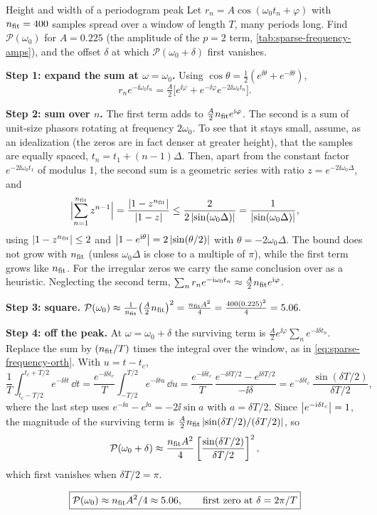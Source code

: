 \begin{sample}{Height and width of a periodogram peak}
Let $r_n=A\cos(\omega_0t_n+\varphi)$ with $n_{\rm fit}=400$ samples spread over a window of length $T$, many periods long. Find $\mathcal P(\omega_0)$ for $A=0.225$ (the amplitude of the $p=2$ term, \cref{tab:sparse-frequency-amps}), and the offset $\delta$ at which $\mathcal P(\omega_0+\delta)$ first vanishes.

\textbf{Step 1: expand the sum at $\omega=\omega_0$.} Using $\cos\theta=\tfrac12(e^{\ii\theta}+e^{-\ii\theta})$,
$$r_ne^{-\ii\omega_0t_n}=\tfrac A2\bigl[e^{\ii\varphi}+e^{-\ii\varphi}e^{-2\ii\omega_0t_n}\bigr].$$

\textbf{Step 2: sum over $n$.} The first term adds to $\tfrac A2n_{\rm fit}e^{\mathrm{i}\varphi}$. The second is a sum of unit-size phasors rotating at frequency $2\omega_0$. To see that it stays small, assume, as an idealization (the zeros are in fact denser at greater height), that the samples are equally spaced, $t_n=t_1+(n-1)\Delta$. Then, apart from the constant factor $e^{-2\ii\omega_0t_1}$ of modulus 1, the second sum is a geometric series with ratio $z=e^{-2\ii\omega_0\Delta}$, and
$$\Bigl|\sum_{n=1}^{n_{\rm fit}}z^{n-1}\Bigr|=\frac{\left\lvert 1-z^{n_{\rm fit}}\right\rvert}{\left\lvert 1-z\right\rvert}\le\frac{2}{2\left\lvert \sin(\omega_0\Delta)\right\rvert}=\frac{1}{\left\lvert \sin(\omega_0\Delta)\right\rvert},$$
using $\left\lvert 1-z^{n_{\rm fit}}\right\rvert\le2$ and $\left\lvert 1-e^{\mathrm{i}\theta}\right\rvert=2\left\lvert \sin(\theta/2)\right\rvert$ with $\theta=-2\omega_0\Delta$. The bound does not grow with $n_{\rm fit}$ (unless $\omega_0\Delta$ is close to a multiple of $\pi$), while the first term grows like $n_{\rm fit}$. For the irregular zeros we carry the same conclusion over as a heuristic. Neglecting the second term,
$\sum_nr_ne^{-\mathrm{i}\omega_0t_n}\approx\tfrac A2n_{\rm fit}e^{\mathrm{i}\varphi}$.

\textbf{Step 3: square.} $\mathcal P(\omega_0)\approx\frac{1}{n_{\rm fit}}\bigl(\tfrac A2n_{\rm fit}\bigr)^2=\frac{n_{\rm fit}A^2}{4}=\frac{400(0.225)^2}{4}=5.06.$

\textbf{Step 4: off the peak.} At $\omega=\omega_0+\delta$ the surviving term is $\tfrac A2e^{\ii\varphi}\sum_ne^{-\ii\delta t_n}$. Replace the sum by $(n_{\rm fit}/T)$ times the integral over the window, as in \eqref{eq:sparse-frequency-orth}. With $u=t-t_c$,
$$\frac1T\int_{t_c-T/2}^{t_c+T/2}e^{-\ii\delta t}\,\dd t=\frac{e^{-\ii\delta t_c}}{T}\int_{-T/2}^{T/2}e^{-\ii\delta u}\,\dd u=\frac{e^{-\ii\delta t_c}}{T}\,\frac{e^{-\ii\delta T/2}-e^{\ii\delta T/2}}{-\ii\delta}=e^{-\ii\delta t_c}\,\frac{\sin(\delta T/2)}{\delta T/2},$$
where the last step uses $e^{-\ii a}-e^{\ii a}=-2\ii\sin a$ with $a=\delta T/2$. Since $\left\lvert e^{-\mathrm{i}\delta t_c}\right\rvert=1$, the magnitude of the surviving term is $\tfrac A2n_{\rm fit}\left\lvert \sin(\delta T/2)/(\delta T/2)\right\rvert$, so
\begin{equation}
\mathcal P(\omega_0+\delta)\approx\frac{n_{\rm fit}A^2}{4}\left[\frac{\sin(\delta T/2)}{\delta T/2}\right]^2 ,
\label{eq:sparse-frequency-peak}
\end{equation}
which first vanishes when $\delta T/2=\pi$.

$$\boxed{\mathcal P(\omega_0)\approx n_{\rm fit}A^2/4\approx5.06,\qquad \text{first zero at }\delta=2\pi/T}$$
\end{sample}

